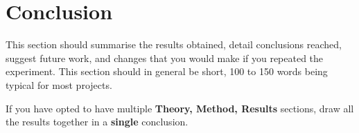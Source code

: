 \section{Conclusion}
This section should summarise the results obtained, detail
conclusions reached, suggest future work, and changes that you would make if you repeated the
experiment. This section should in general be short, 100 to 150 words
being typical for most projects.
\par\noindent
If you have opted to have multiple {\bf Theory, Method, Results}
sections, draw all the results together in a {\bf single} conclusion.